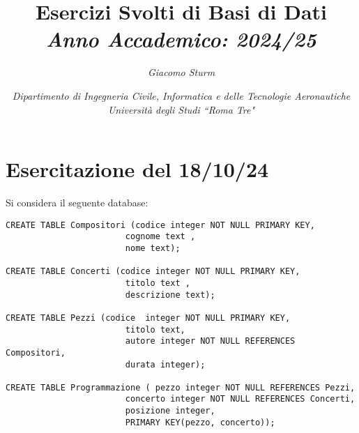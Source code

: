 \documentclass{article}
\numberwithin{equation}{subsection}
\begin{document}
\title{%
    \textbf{Esercizi Svolti di Basi di Dati}  \\ 
    \textit{Anno Accademico: 2024/25}}
\author{\textit{Giacomo Sturm}}
\date{\textit{Dipartimento di Ingegneria Civile, Informatica e delle Tecnologie Aeronautiche \\
Università degli Studi ``Roma Tre"}}

\maketitle
\thispagestyle{link}

\clearpage


\pagestyle{fancy}
\fancyhead{}\fancyfoot{}
\fancyfoot[C]{\thepage}

\tableofcontents

\clearpage
{}

\section{Esercitazione del 18/10/24}


Si considera il seguente database:
\begin{verbatim}
CREATE TABLE Compositori (codice integer NOT NULL PRIMARY KEY,
                        cognome text ,
                        nome text);
						
CREATE TABLE Concerti (codice integer NOT NULL PRIMARY KEY,
                        titolo text ,
                        descrizione text);

CREATE TABLE Pezzi (codice  integer NOT NULL PRIMARY KEY,
                        titolo text,
                        autore integer NOT NULL REFERENCES Compositori,
                        durata integer);

CREATE TABLE Programmazione ( pezzo integer NOT NULL REFERENCES Pezzi,
                        concerto integer NOT NULL REFERENCES Concerti, 
                        posizione integer,
                        PRIMARY KEY(pezzo, concerto));

\end{verbatim}
\end{document}
